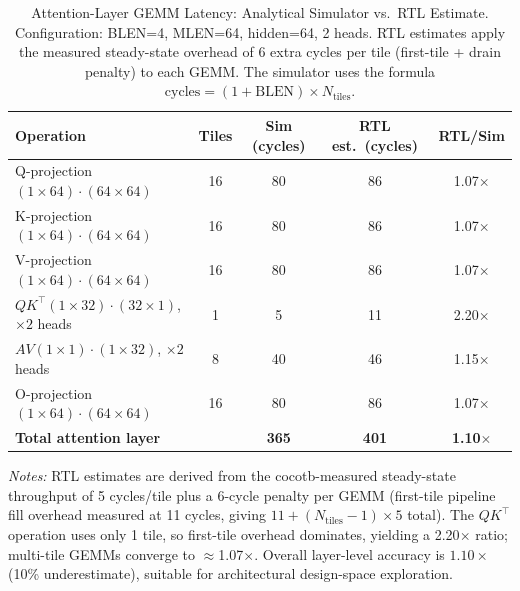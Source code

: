 \begin{table}[t]
\centering
\caption{Attention-Layer GEMM Latency: Analytical Simulator vs.\ RTL Estimate.
  Configuration: BLEN=4, MLEN=64, hidden=64, 2 heads.
  RTL estimates apply the measured steady-state overhead of 6 extra cycles
  per tile (first-tile + drain penalty) to each GEMM.
  The simulator uses the formula $\text{cycles} = (1+\text{BLEN}) \times N_\text{tiles}$.}
\label{tab:layer_latency}
\begin{tabular}{@{}lcccc@{}}
\toprule
\textbf{Operation} & \textbf{Tiles} &
  \textbf{Sim (cycles)} & \textbf{RTL est.\ (cycles)} & \textbf{RTL/Sim} \\
\midrule
Q-projection $(1\times64)\cdot(64\times64)$  & 16 &  80 &  86 & 1.07$\times$ \\
K-projection $(1\times64)\cdot(64\times64)$  & 16 &  80 &  86 & 1.07$\times$ \\
V-projection $(1\times64)\cdot(64\times64)$  & 16 &  80 &  86 & 1.07$\times$ \\
$QK^\top$\;$(1\times32)\cdot(32\times1)$, $\times 2$ heads
                                              &  1 &   5 &  11 & 2.20$\times$ \\
$AV$\;$(1\times1)\cdot(1\times32)$, $\times 2$ heads
                                              &  8 &  40 &  46 & 1.15$\times$ \\
O-projection $(1\times64)\cdot(64\times64)$  & 16 &  80 &  86 & 1.07$\times$ \\
\midrule
\textbf{Total attention layer}               &    & \textbf{365} & \textbf{401} & \textbf{1.10$\times$} \\
\bottomrule
\end{tabular}
\smallskip

\raggedright
\footnotesize
\textit{Notes:}
RTL estimates are derived from the cocotb-measured steady-state throughput of
5 cycles/tile plus a 6-cycle penalty per GEMM (first-tile pipeline fill overhead
measured at 11 cycles, giving $11 + (N_\text{tiles}-1)\times5$ total).
The $QK^\top$ operation uses only 1 tile, so first-tile overhead dominates,
yielding a 2.20$\times$ ratio; multi-tile GEMMs converge to $\approx$1.07$\times$.
Overall layer-level accuracy is $1.10\times$ (10\% underestimate), suitable for
architectural design-space exploration.
\end{table}
